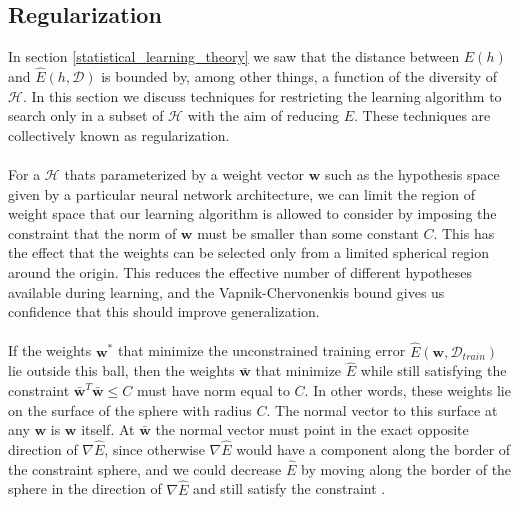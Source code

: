 \subsection{Regularization}
\label{regularisation}
In section \ref{statistical_learning_theory} we saw that the distance between $E(h)$ and $\hat{E}(h, \mathcal{D})$ is bounded by, among other things, a function of the diversity of $\mathcal{H}$. In this section we discuss techniques for restricting the learning algorithm to search only in a subset of $\mathcal{H}$ with the aim of reducing $E$. These techniques are collectively known as regularization.
\\\\
For a $\mathcal{H}$ thats parameterized by a weight vector $\mathbf{w}$ such as the hypothesis space given by a particular neural network architecture, we can limit the region of weight space that our learning algorithm is allowed to consider by imposing the constraint that the norm of $\mathbf{w}$ must be smaller than some constant $C$. This has the effect that the weights can be selected only from a limited spherical region around the origin. This reduces the effective number of different hypotheses available during learning, and the Vapnik-Chervonenkis bound gives us confidence that this should improve generalization.
\\\\
If the weights $\mathbf{w}^*$ that minimize the unconstrained training error $\hat{E}(\mathbf{w}, \mathcal{D}_{train})$ lie outside this ball, then the weights $\bar{\mathbf{w}}$ that minimize $\hat{E}$ while still satisfying the constraint $\bar{\mathbf{w}}^T\bar{\mathbf{w}} \leq C$ must have norm equal to $C$. In other words, these weights lie on the surface of the sphere with radius $C$. The normal vector to this surface at any $\mathbf{w}$ is $\mathbf{w}$ itself. At $\bar{\mathbf{w}}$ the normal vector must point in the exact opposite direction of $\nabla \hat{E}$, since otherwise $\nabla \hat{E}$ would have a component along the border of the constraint sphere, and we could decrease $\hat{E}$ by moving along the border of the sphere in the direction of $\nabla \hat{E}$ and still satisfy the constraint \citep{yaser12}. 

